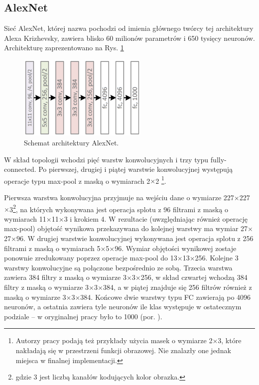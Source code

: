 \subsection{AlexNet}
\label{AlexNet}
Sieć AlexNet, której nazwa pochodzi od imienia głównego twórcy tej architektury Alexa Krizhevsky, zawiera blisko 60 milionów parametrów i 650 tysięcy neuronów. Architekturę zaprezentowano na Rys. \ref{AlexNetTopology}
\begin{figure}[h!]
	\centering
	\includegraphics[width=0.55\textwidth]{figures/AlexNet.png}
	\caption{Schemat architektury AlexNet.}
	\label{AlexNetTopology}
\end{figure}

W skład topologii wchodzi pięć warstw konwolucyjnych i trzy typu fully-connected. Po pierwszej, drugiej i piątej warstwie konwolucyjnej występują operacje typu max-pool z maską o wymiarach 2$\times$2 \footnote{Autorzy pracy podają też przykłady użycia masek o wymiarze 2$\times$3, które nakładają się w przestrzeni funkcji obrazowej. Nie znalazły one jednak miejsca w finalnej implementacji.}. 

Pierwsza warstwa konwolucyjna przyjmuje na wejściu dane o wymiarze 227$\times$227$\times$3\footnote{gdzie 3 jest liczbą kanałów kodujących kolor obrazka.}, na których wykonywana jest operacja splotu z 96 filtrami z maską o wymiarach 11$\times$11$\times$3 i krokiem 4. W rezultacie (uwzględniając również operację max-pool) objętość wynikowa przekazywana do kolejnej warstwy ma wymiar 27$\times$27$\times$96. W drugiej warstwie konwolucyjnej wykonywana jest operacja splotu z 256 filtrami z maską o wymiarach 5$\times$5$\times$96. Wymiar objętości wynikowej zostaje ponownie zredukowany poprzez operacje max-pool do 13$\times$13$\times$256. Kolejne 3 warstwy konwolucyjne są połączone bezpośrednio ze sobą. Trzecia warstwa zawiera 384 filtry z maską o wymiarze 3$\times$3$\times$256, w skład czwartej wchodzą 384 filtry z maską o wymiarze 3$\times$3$\times$384, a w piątej znajduje się 256 filtrów również z maską o wymiarze 3$\times$3$\times$384. Końcowe dwie warstwy typu FC zawierają po 4096 neuronów, a ostatnia zawiera tyle neuronów ile klas występuje w ostatecznym podziale -- w oryginalnej pracy było to 1000 (por. \cite{Krizhevsky2012}).

